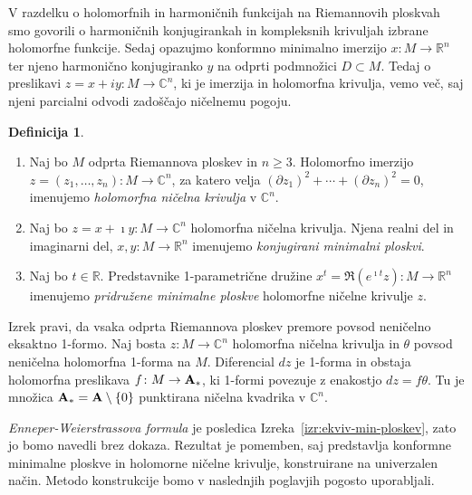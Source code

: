 \documentclass[12pt,a4paper,twoside]{article}
\theoremstyle{definition} %
\newtheorem{definicija}{Definicija}[section]
\theoremstyle{plain} %
\numberwithin{equation}{section}  %
\newcommand{\R}{\mathbb R}
\newcommand{\C}{\mathbb C}
\begin{document}
V razdelku o holomorfnih in harmoničnih funkcijah na Riemannovih ploskvah smo govorili o harmoničnih konjugirankah in kompleksnih krivuljah izbrane holomorfne funkcije. Sedaj opazujmo konformno minimalno imerzijo $x \colon M \to \mathbb{R}^{n}$ ter njeno harmonično konjugiranko $y$ na odprti podmnožici $D \subset M$. Tedaj o preslikavi $z = x + iy \colon M \to \mathbb{C}^{n}$, ki je imerzija in holomorfna krivulja, vemo več, saj njeni parcialni odvodi zadoščajo ničelnemu pogoju.
%
\begin{definicija}
\begin{enumerate}
\item
Naj bo $M$ odprta Riemannova ploskev in $n \geq 3$. Holomorfno imerzijo $z = (z_{1}, \dots , z_{n}) \colon M \to \C^{n}$, za katero velja
$(\partial{z_{1}})^2 + \cdots + (\partial{z_{n}})^2 = 0$, imenujemo \emph{holomorfna ničelna krivulja} v $\C^{n}$.
\item
Naj bo $z = x + \imath y \colon M \to \C^{n}$ holomorfna ničelna krivulja. Njena realni del in imaginarni del, $x, y \colon M \to \R^{n}$ imenujemo \emph{konjugirani minimalni ploskvi}.
\item
Naj bo $t \in \R$. Predstavnike 1-parametrične družine $x^{t} = \Re{(e^{\imath t} z)} \colon M \to \R^{n}$ imenujemo \emph{pridružene minimalne ploskve} holomorfne ničelne krivulje $z$.
\end{enumerate}
\end{definicija}

Izrek pravi, da vsaka odprta Riemannova ploskev premore povsod neničelno eksaktno 1-formo.
Naj bosta $z \colon M \to \mathbb{C}^{n}$ holomorfna ničelna krivulja in $\theta$ povsod neničelna holomorfna 1-forma na $M$. Diferencial $dz$ je 1-forma in obstaja holomorfna preslikava $f \colon M \to \textbf{\textup{A}}_{*}$, ki 1-formi povezuje z enakostjo $dz = f \theta$. Tu je množica $\textbf{\textup{A}}_{*} = \textbf{\textup{A}} \setminus \{0\}$ punktirana ničelna kvadrika v $\mathbb{C}^{n}$.

\emph{Enneper-Weierstrassova formula} je posledica Izreka~\ref{izr:ekviv-min-ploskev}, zato jo bomo navedli brez dokaza. Rezultat je pomemben, saj predstavlja konformne minimalne ploskve in holomorne ničelne krivulje, konstruirane na univerzalen način. Metodo konstrukcije bomo v naslednjih poglavjih pogosto uporabljali.
\end{document}
